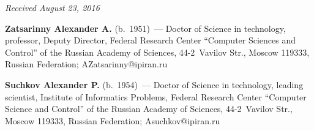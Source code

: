 \begin{multicols}{2}
{{ }
 }

\end{multicols}

\vspace*{-6pt}

\hfill{\small\textit{Received August 23, 2016}}

\vspace*{-12pt}

\Contr

\noindent
\textbf{Zatsarinny Alexander A.} (b.\ 1951)~--- Doctor of Science in technology, 
professor, 
Deputy Director, Federal Research Center ``Computer Sciences and Control'' of the 
Russian Academy of Sciences, 44-2~Vavilov Str., Moscow 119333, Russian Federation; 
\mbox{AZatsarinny@ipiran.ru}


\vspace*{3pt}


\noindent
\textbf{Suchkov Alexander P.} (b.\ 1954)~--- Doctor of Science in technology, 
leading scientist, Institute of Informatics Problems, Federal Research Center 
``Computer Science and Control'' of the 
Russian Academy of Sciences, 44-2~Vavilov Str., Moscow 119333, 
Russian Federation; \mbox{Asuchkov@ipiran.ru}

 


\label{end\stat}


\renewcommand{\bibname}{\protect\rm Литература} 